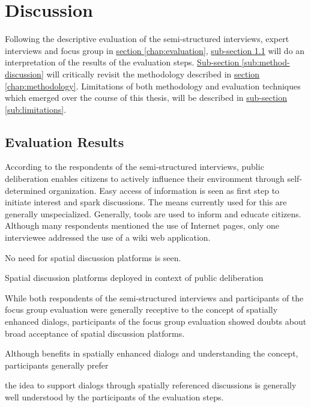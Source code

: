 \section{Discussion}
\label{chap:discussion}
Following the descriptive evaluation of the semi-structured interviews, expert interviews and focus group in \hyperref[chap:evaluation]{section \ref{chap:evaluation}}, \hyperref[sub:evaluation-results]{sub-section \ref{sub:evaluation-results}} will do an interpretation of the results of the evaluation steps. \hyperref[sub:method-discussion]{Sub-section \ref{sub:method-discussion}} will critically revisit the methodology described in \hyperref[chap:methodology]{section \ref{chap:methodology}}. Limitations of both methodology and evaluation techniques which emerged over the course of this thesis, will be described in \hyperref[sub:limitations]{sub-section \ref{sub:limitations}}.

\subsection{Evaluation Results}
\label{sub:evaluation-results}
According to the respondents of the semi-structured interviews, public deliberation enables citizens to actively influence their environment through self-determined organization. Easy access of information is seen as first step to initiate interest and spark discussions. The means currently used for this are generally unspecialized. Generally, tools are used to inform and educate citizens. Although many respondents mentioned the use of Internet pages, only one interviewee addressed the use of a wiki web application. 



No need for spatial discussion platforms is seen.



Spatial discussion platforms deployed in context of public deliberation

While both respondents of the semi-structured interviews and participants of the focus group evaluation were generally receptive to the concept of spatially enhanced dialogs, participants of the focus group evaluation showed doubts about broad acceptance of spatial discussion platforms.

Although  benefits in spatially enhanced dialogs and understanding the concept, participants generally prefer 

the idea to support dialogs through spatially referenced discussions is generally well understood by the participants of the evaluation steps.


